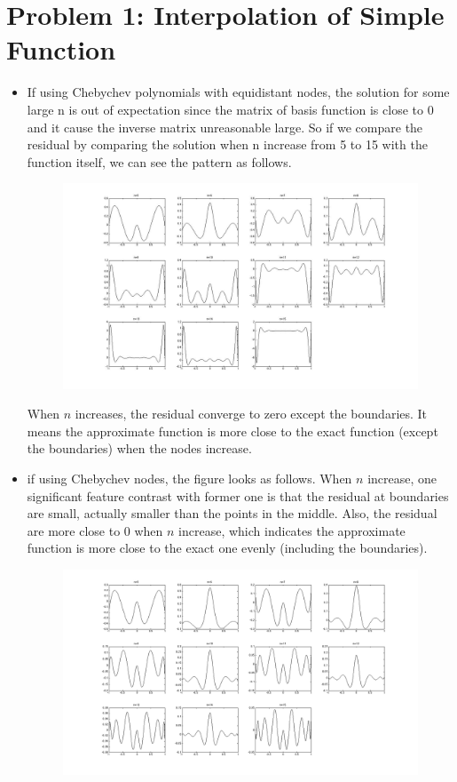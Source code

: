 \section*{Problem 1: Interpolation of Simple Function}


\begin{itemize}
\item
If using Chebychev polynomials with equidistant nodes, the solution for some large n is out of expectation since the matrix of basis function is close to 0 and it cause the inverse matrix unreasonable large. So if we compare the residual by comparing the solution when n increase from 5 to 15 with the function itself, we can see the pattern as follows.
\begin{figure}[htbp]
\centering
\includegraphics[width=\linewidth]{Figure/Q1_equinode.jpg}
\end{figure}
When $n$ increases, the residual converge to zero except the boundaries. It means the approximate function is more close to the exact function (except the boundaries) when the nodes increase.
\item


if using Chebychev nodes, the figure looks as follows. When $n$ increase, one significant feature contrast with former one is that the residual at boundaries are small, actually smaller than the points in the middle. Also, the residual are more close to 0 when $n$ increase, which indicates the approximate function is more close to the exact one evenly (including the boundaries).
\begin{figure}[htbp]
\centering
\includegraphics[width=\linewidth]{Figure/Q1_chebychev.png}
\end{figure}
\end{itemize}
\pagebreak
